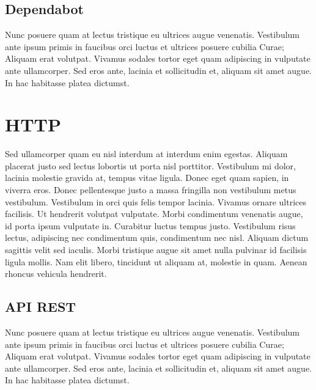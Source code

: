 \subsection{Dependabot}

Nunc posuere quam at lectus tristique eu ultrices augue venenatis. Vestibulum ante ipsum primis in faucibus orci luctus et ultrices posuere cubilia Curae; Aliquam erat volutpat. Vivamus sodales tortor eget quam adipiscing in vulputate ante ullamcorper. Sed eros ante, lacinia et sollicitudin et, aliquam sit amet augue. In hac habitasse platea dictumst.


\section{HTTP}

Sed ullamcorper quam eu nisl interdum at interdum enim egestas. Aliquam placerat justo sed lectus lobortis ut porta nisl porttitor. Vestibulum mi dolor, lacinia molestie gravida at, tempus vitae ligula. Donec eget quam sapien, in viverra eros. Donec pellentesque justo a massa fringilla non vestibulum metus vestibulum. Vestibulum in orci quis felis tempor lacinia. Vivamus ornare ultrices facilisis. Ut hendrerit volutpat vulputate. Morbi condimentum venenatis augue, id porta ipsum vulputate in. Curabitur luctus tempus justo. Vestibulum risus lectus, adipiscing nec condimentum quis, condimentum nec nisl. Aliquam dictum sagittis velit sed iaculis. Morbi tristique augue sit amet nulla pulvinar id facilisis ligula mollis. Nam elit libero, tincidunt ut aliquam at, molestie in quam. Aenean rhoncus vehicula hendrerit.

\subsection{API REST}

Nunc posuere quam at lectus tristique eu ultrices augue venenatis. Vestibulum ante ipsum primis in faucibus orci luctus et ultrices posuere cubilia Curae; Aliquam erat volutpat. Vivamus sodales tortor eget quam adipiscing in vulputate ante ullamcorper. Sed eros ante, lacinia et sollicitudin et, aliquam sit amet augue. In hac habitasse platea dictumst.
